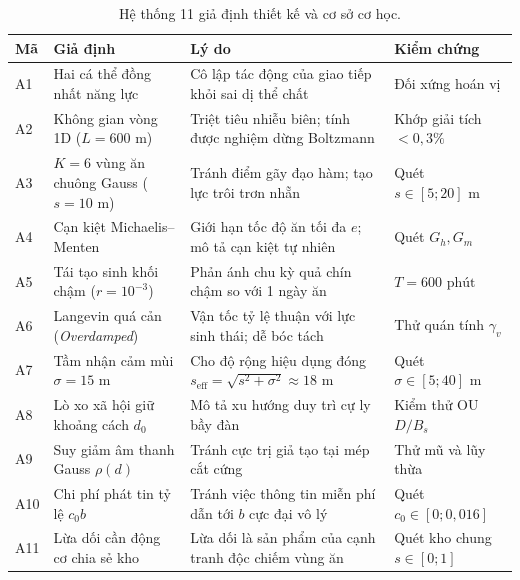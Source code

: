 \documentclass[11pt,a4paper]{report}
\newcommand{\seff}{s_{\mathrm{eff}}}
\begin{document}
\begin{table}[htbp]
\centering
\small
\caption{Hệ thống 11 giả định thiết kế và cơ sở cơ học.}\label{tab:assumptions}
\begin{tabularx}{\textwidth}{@{}llXl@{}}
\toprule
\textbf{Mã} & \textbf{Giả định} & \textbf{Lý do} & \textbf{Kiểm chứng} \\
\midrule
A1 & Hai cá thể đồng nhất năng lực & Cô lập tác động của giao tiếp khỏi sai dị thể chất & Đối xứng hoán vị \\
A2 & Không gian vòng 1D ($L=600\text{ m}$) & Triệt tiêu nhiễu biên; tính được nghiệm dừng Boltzmann & Khớp giải tích $<0{,}3\%$ \\
A3 & $K=6$ vùng ăn chuông Gauss ($s=10\text{ m}$) & Tránh điểm gãy đạo hàm; tạo lực trôi trơn nhẵn & Quét $s \in [5; 20]\text{ m}$ \\
A4 & Cạn kiệt Michaelis--Menten & Giới hạn tốc độ ăn tối đa $e$; mô tả cạn kiệt tự nhiên & Quét $G_h, G_m$ \\
A5 & Tái tạo sinh khối chậm ($r=10^{-3}$) & Phản ánh chu kỳ quả chín chậm so với 1 ngày ăn & $T = 600\text{ phút}$ \\
A6 & Langevin quá cản (\textit{Overdamped}) & Vận tốc tỷ lệ thuận với lực sinh thái; dễ bóc tách & Thử quán tính $\gamma_v$ \\
A7 & Tầm nhận cảm mùi $\sigma = 15\text{ m}$ & Cho độ rộng hiệu dụng đóng $\seff = \sqrt{s^2+\sigma^2} \approx 18\text{ m}$ & Quét $\sigma \in [5; 40]\text{ m}$ \\
A8 & Lò xo xã hội giữ khoảng cách $d_0$ & Mô tả xu hướng duy trì cự ly bầy đàn & Kiểm thử OU $D/B_s$ \\
A9 & Suy giảm âm thanh Gauss $\rho(d)$ & Tránh cực trị giả tạo tại mép cắt cứng & Thử mũ và lũy thừa \\
A10 & Chi phí phát tin tỷ lệ $c_0 b$ & Tránh việc thông tin miễn phí dẫn tới $b$ cực đại vô lý & Quét $c_0 \in [0; 0{,}016]$ \\
A11 & Lừa dối cần động cơ chia sẻ kho & Lừa dối là sản phẩm của cạnh tranh độc chiếm vùng ăn & Quét kho chung $s \in [0; 1]$ \\
\bottomrule
\end{tabularx}
\end{table}
\end{document}
